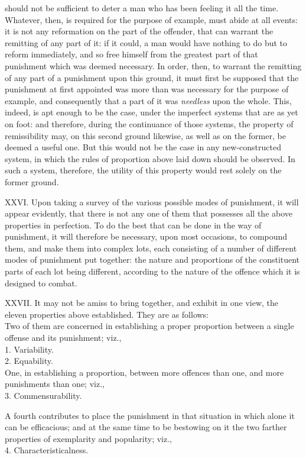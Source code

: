 \documentclass[12pt]{report}
\begin{document}
should not be sufficient to deter a man who has been feeling it all the
time. Whatever, then, is required for the purpose of example, must abide
at all events: it is not any reformation on the part of the offender,
that can warrant the remitting of any part of it: if it could, a man
would have nothing to do but to reform immediately, and so free himself
from the greatest part of that punishment which was deemed necessary. In
order, then, to warrant the remitting of any part of a punishment upon
this ground, it must first be supposed that the punishment at first
appointed was more than was necessary for the purpose of example, and
consequently that a part of it was \emph{needless} upon the whole. This,
indeed, is apt enough to be the case, under the imperfect systems that
are as yet on foot: and therefore, during the continuance of those
systems, the property of remissibility may, on this second ground
likewise, as well as on the former, be deemed a useful one. But this
would not be the case in any new-constructed system, in which the rules
of proportion above laid down should be observed. In such a system,
therefore, the utility of this property would rest solely on the former
ground.

XXVI. Upon taking a survey of the various possible modes of punishment,
it will appear evidently, that there is not any one of them that
possesses all the above properties in perfection. To do the best that
can be done in the way of punishment, it will therefore be necessary,
upon most occasions, to compound them, and make them into complex lots,
each consisting of a number of different modes of punishment put
together: the nature and proportions of the constituent parts of each
lot being different, according to the nature of the offence which it is
designed to combat.

XXVII. It may not be amiss to bring together, and exhibit in one view,
the eleven properties above established. They are as follows:\\
Two of them are concerned in establishing a proper proportion between a
single offense and its punishment; viz.,\\
1. Variability.\\
2. Equability.\\
One, in establishing a proportion, between more offences than one, and
more punishments than one; viz.,\\
3. Commensurability.

A fourth contributes to place the punishment in that situation in which
alone it can be efficacious; and at the same time to be bestowing on it
the two farther properties of exemplarity and popularity; viz.,\\
4. Characteristicalness.
\end{document}
